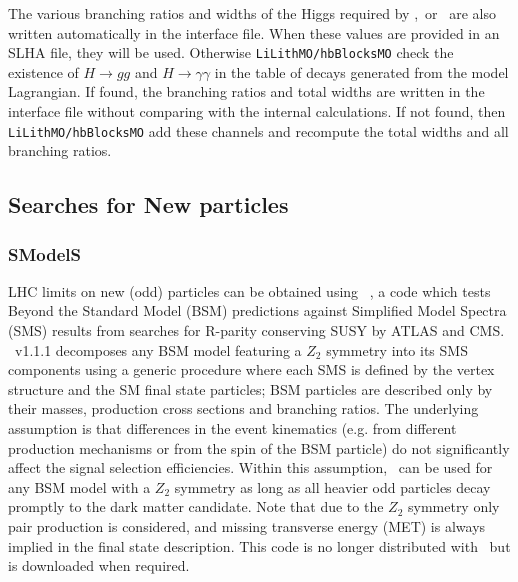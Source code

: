\documentclass[12pt,a4paper]{article}
\begin{document}
The various branching ratios and widths of the Higgs required by   \HB,\HS\ or  \lilith\ are also written automatically in the interface file. When these 
values  are provided in an SLHA file, they will be used. Otherwise {\tt LiLithMO/hbBlocksMO}  check  the existence
of $H\rightarrow gg$  and $H\rightarrow \gamma\gamma$  in the table of decays generated from the model Lagrangian. If found, the branching ratios and total widths are written in the  interface file without comparing  with the internal calculations. If not found, then {\tt LiLithMO/hbBlocksMO} add these channels and  recompute the total widths and all branching ratios.




\subsection{Searches for New particles}

\subsubsection{SModelS}
LHC limits on new (odd) particles can be obtained using \smodels~\cite{Kraml:2013mwa,Kraml:2014sna}, 
a code which tests Beyond the Standard Model (BSM) predictions against Simplified Model Spectra (SMS) results from searches 
for R-parity conserving SUSY by ATLAS and CMS.
\smodels~v1.1.1 decomposes any BSM model featuring a ${Z}_2$ symmetry into its SMS components 
using a generic procedure where each SMS is defined by the vertex structure and the SM final state particles; BSM particles are described only by their masses, production cross sections and branching ratios. 
The underlying assumption is that differences in the event kinematics (e.g. from different production mechanisms or from the spin of the BSM particle) do not significantly affect the signal selection efficiencies. 
Within this assumption, \smodels\ can be used for any BSM model with a ${Z}_2$ symmetry as long as all heavier odd particles decay promptly to the dark matter candidate. Note that due to the ${Z}_2$ symmetry only pair production is considered, and missing transverse energy (MET) is always implied in the final state description.
This code is no longer distributed with \micro\ but is downloaded when required. 
\end{document}
